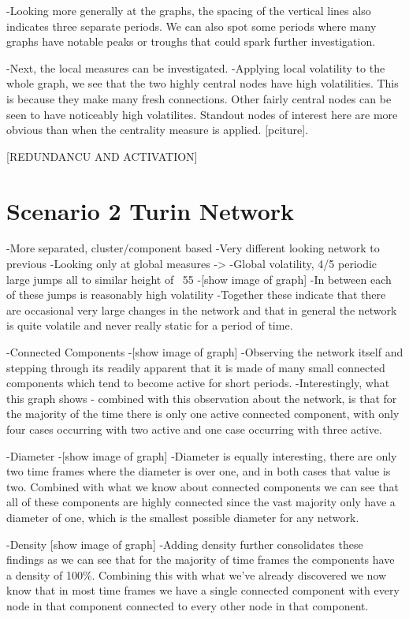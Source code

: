     -Looking more generally at the graphs, the spacing of the vertical lines also indicates three separate periods. We can also spot some periods where many graphs have notable peaks or troughs that could spark further investigation.
    
    -Next, the local measures can be investigated.
    -Applying local volatility to the whole graph, we see that the two highly central nodes have high volatilities. This is because they make many fresh connections. Other fairly central nodes can be seen to have noticeably high volatilites. Standout nodes of interest here are more obvious than when the centrality measure is applied. [pciture]. 
    
    [REDUNDANCU AND ACTIVATION]


\section{Scenario 2 Turin Network}
-More separated, cluster/component based
-Very different looking network to previous
-Looking only at global measures ->
    -Global volatility, 4/5 periodic large jumps all to similar height of ~55
    -[show image of graph]
    -In between each of these jumps is reasonably high volatility
    -Together these indicate that there are occasional very large changes in the network and that in general the network is quite volatile and never really static for a period of time.
    
    -Connected Components
    -[show image of graph]
    -Observing the network itself and stepping through its readily apparent that it is made of many small connected components which tend to become active for short periods.
    -Interestingly, what this graph shows - combined with this observation about the network, is that for the majority of the time there is only one active connected component, with only four cases occurring with two active and one case occurring with three active.
    
    -Diameter
    -[show image of graph]
    -Diameter is equally interesting, there are only two time frames where the diameter is over one, and in both cases that value is two. Combined with what we know about connected components we can see that all of these components are highly connected since the vast majority only have a diameter of one, which is the smallest possible diameter for any network.
    
    -Density
    [show image of graph]
    -Adding density further consolidates these findings as we can see that for the majority of time frames the components have a density of 100\%. Combining this with what we've already discovered we now know that in most time frames we have a single connected component with every node in that component connected to every other node in that component.
    

